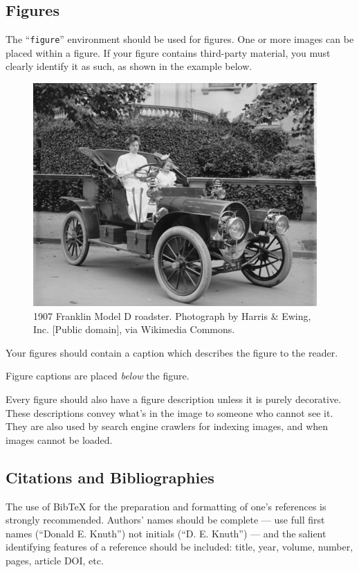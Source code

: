 \subsection{Figures}

The ``\verb|figure|'' environment should be used for figures. One or more images can be placed within a figure. If your figure contains third-party material, you must clearly identify it as such, as shown in the example below.
\begin{figure}[ht]
	\centering
	\includegraphics[width=\linewidth]{figures/sample-franklin}
	\caption{1907 Franklin Model D roadster. Photograph by Harris \&
		Ewing, Inc. [Public domain], via Wikimedia
		Commons.}
\end{figure}

Your figures should contain a caption which describes the figure to the reader.

Figure captions are placed {\itshape below} the figure.

Every figure should also have a figure description unless it is purely decorative. These descriptions convey what’s in the image to someone who cannot see it. They are also used by search engine crawlers for indexing images, and when images cannot be loaded.

\subsection{Citations and Bibliographies}

The use of BibTeX for the preparation and formatting of one's references is strongly recommended. Authors' names should be complete --- use full first names (``Donald E. Knuth'') not initials (``D. E. Knuth'') --- and the salient identifying features of a reference should be included: title, year, volume, number, pages, article DOI, etc.

